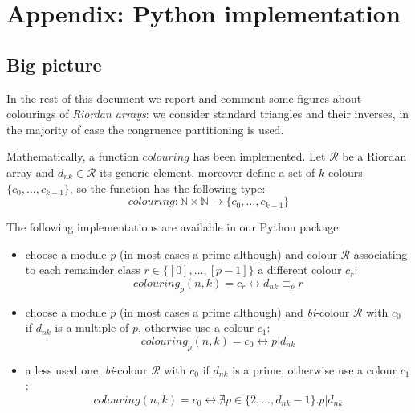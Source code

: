 \chapter{Appendix: Python implementation}

\section{Big picture}

In the rest of this document we report and comment some figures about
colourings of \emph{Riordan arrays}: we consider standard triangles and their
inverses, in the majority of case the congruence partitioning is used.

Mathematically, a function $colouring$ has been implemented. Let $\mathcal{R}$
be a Riordan array and $d_{nk} \in \mathcal{R}$ its generic element, moreover
define a set of $k$ colours $\lbrace c_0, \ldots, c_{k-1} \rbrace$, so the
function has the following type: 
\begin{displaymath} 
    colouring : \mathbb{N} \times\mathbb{N} \rightarrow \lbrace c_0, \ldots, c_{k-1} \rbrace
\end{displaymath}

The following implementations are available in our Python package:
\begin{itemize}
    \item choose a module $p$ (in most cases a prime although) and
        colour $\mathcal{R}$ associating to each remainder class 
        $r \in \lbrace[0],\ldots,[p-1]\rbrace$
        a different colour $c_r$:
        \begin{displaymath}
            colouring_{p}(n,k) = c_{r} \leftrightarrow d_{nk} \equiv_{p} r
        \end{displaymath}
    \item choose a module $p$ (in most cases a prime although) and
        \emph{bi}-colour $\mathcal{R}$ with $c_0$ if $d_{nk}$ 
        is a multiple of $p$, otherwise use a colour $c_1$:
        \begin{displaymath}
            colouring_{p}(n,k) = c_{0} \leftrightarrow p | d_{nk}
        \end{displaymath}
    \item a less used one, \emph{bi}-colour $\mathcal{R}$ with $c_0$ 
        if $d_{nk}$ is a prime, otherwise use a colour $c_1$:
        \begin{displaymath}
            colouring(n,k) = c_{0} \leftrightarrow 
                \nexists p\in\lbrace 2,\ldots,d_{nk}-1\rbrace.p|d_{nk} 
        \end{displaymath}
\end{itemize}

